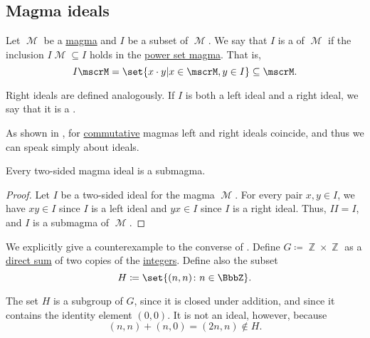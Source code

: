 \subsection{Magma ideals}\label{sec:magma_ideals}

\begin{definition}\label{def:magma_ideal}\mimprovised
  Let \( \mscrM \) be a \hyperref[def:magma]{magma} and \( I \) be a subset of \( \mscrM \). We say that \( I \) is a  of \( \mscrM \) if the inclusion \( I\mscrM \subseteq I \) holds in the \hyperref[def:magma/power_set]{power set magma}. That is,
  \begin{equation*}
    I \mscrM = \set{ x \cdot y | x \in \mscrM, y \in I } \subseteq \mscrM.
  \end{equation*}

  Right ideals are defined analogously. If \( I \) is both a left ideal and a right ideal, we say that it is a .

  As shown in , for \hyperref[def:magma/commutative]{commutative} magmas left and right ideals coincide, and thus we can speak simply about ideals.
\end{definition}

\begin{proposition}\label{thm:magma_ideal_is_submagma}
  Every two-sided magma ideal is a submagma.
\end{proposition}
\begin{proof}
  Let \( I \) be a two-sided ideal for the magma \( \mscrM \). For every pair \( x, y \in I \), we have \( xy \in I \) since \( I \) is a left ideal and \( yx \in I \) since \( I \) is a right ideal. Thus, \( II = I \), and \( I \) is a submagma of \( \mscrM \).
\end{proof}

\begin{example}\label{ex:subgroup_is_not_ideal}
  We explicitly give a counterexample to the converse of . Define \( G \coloneqq \BbbZ \times \BbbZ \) as a \hyperref[def:group_direct_sum]{direct sum} of two copies of the \hyperref[def:set_of_integers]{integers}. Define also the subset
  \begin{equation*}
    H \coloneqq \set{ (n, n) \colon n \in \BbbZ }.
  \end{equation*}

  The set \( H \) is a subgroup of \( G \), since it is closed under addition, and since it contains the identity element \( (0, 0) \). It is not an ideal, however, because
  \begin{equation*}
    (n, n) + (n, 0) = (2n, n) \not\in H.
  \end{equation*}
\end{example}


